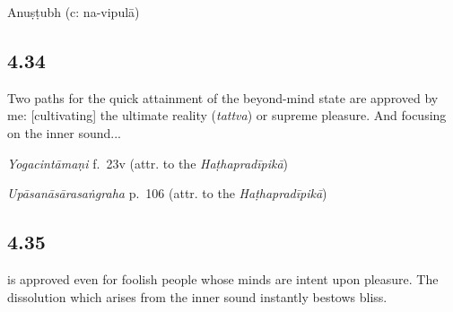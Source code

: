 \begin{ekdosis}
\begin{metre}[hp04_033]
Anuṣṭubh (c: na-vipulā)
\end{metre}

\subsection*{4.34}
\begin{translation}[hp04_034]
Two paths for the quick attainment of the beyond-mind state are approved by me: [cultivating] the ultimate reality (\emph{tattva}) or supreme pleasure. And focusing on the inner sound...
\end{translation}



\begin{testimonia}[hp04_034]
\emph{Yogacintāmaṇi} f.~23v (attr. to the \emph{Haṭhapradīpikā})
\begin{versinnote}
\end{versinnote}

\emph{Upāsanāsārasaṅgraha} p.~106 (attr. to the \emph{Haṭhapradīpikā})
\begin{versinnote}
\end{versinnote}
\end{testimonia}



\subsection*{4.35}
\begin{translation}[hp04_035]
 is approved even for foolish people whose minds are intent upon pleasure. The dissolution which arises from the inner sound instantly bestows bliss.
\end{translation}


\end{ekdosis}
